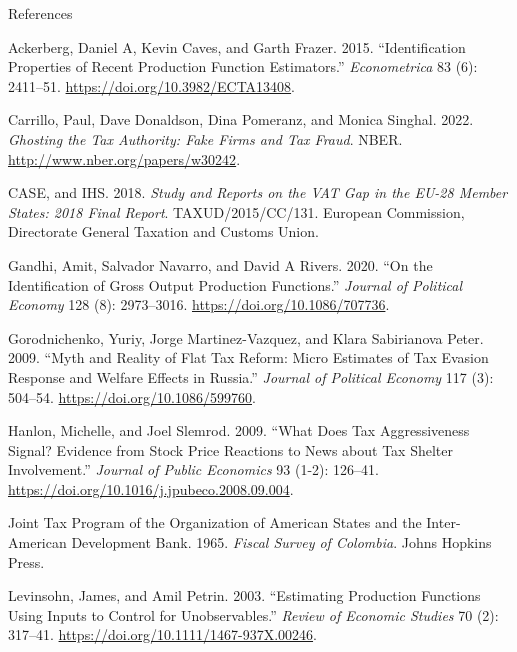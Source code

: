 \documentclass[
  ignorenonframetext,
  aspectratio=169,
]{beamer}
\newlength{\cslhangindent}
\newenvironment{CSLReferences}[2] %
 {\begin{list}{}{%
  \setlength{\itemindent}{0pt}
  \setlength{\leftmargin}{0pt}
  \setlength{\parsep}{0pt}
  \ifodd #1
   \setlength{\leftmargin}{\cslhangindent}
   \setlength{\itemindent}{-1\cslhangindent}
  \fi
  \setlength{\itemsep}{#2\baselineskip}}}
 {\end{list}}
\begin{document}
\begin{frame}{References}
\protect{}\label{references}
\protect{}\label{refs}
\begin{CSLReferences}{1}{1}
Ackerberg, Daniel A, Kevin Caves, and Garth Frazer. 2015.
{``Identification Properties of Recent Production Function
Estimators.''} \emph{Econometrica} 83 (6): 2411--51.
\url{https://doi.org/10.3982/ECTA13408}.

Carrillo, Paul, Dave Donaldson, Dina Pomeranz, and Monica Singhal. 2022.
\emph{Ghosting the Tax Authority: Fake Firms and Tax Fraud}. NBER.
\url{http://www.nber.org/papers/w30242}.

CASE, and IHS. 2018. \emph{Study and Reports on the {VAT} Gap in the
{EU}-28 Member States: 2018 Final Report}. TAXUD/2015/CC/131. {European
Commission, Directorate General Taxation and Customs Union}.

Gandhi, Amit, Salvador Navarro, and David A Rivers. 2020. {``On the
Identification of Gross Output Production Functions.''} \emph{Journal of
Political Economy} 128 (8): 2973--3016.
\url{https://doi.org/10.1086/707736}.

Gorodnichenko, Yuriy, Jorge Martinez-Vazquez, and Klara Sabirianova
Peter. 2009. {``Myth and Reality of Flat Tax Reform: Micro Estimates of
Tax Evasion Response and Welfare Effects in {Russia}.''} \emph{Journal
of Political Economy} 117 (3): 504--54.
\url{https://doi.org/10.1086/599760}.

Hanlon, Michelle, and Joel Slemrod. 2009. {``What Does Tax
Aggressiveness Signal? Evidence from Stock Price Reactions to News about
Tax Shelter Involvement.''} \emph{Journal of Public Economics} 93 (1-2):
126--41. \url{https://doi.org/10.1016/j.jpubeco.2008.09.004}.

Joint Tax Program of the Organization of American States and the
Inter-American Development Bank. 1965. \emph{Fiscal Survey of
{Colombia}}. Johns Hopkins Press.

Levinsohn, James, and Amil Petrin. 2003. {``Estimating Production
Functions Using Inputs to Control for Unobservables.''} \emph{Review of
Economic Studies} 70 (2): 317--41.
\url{https://doi.org/10.1111/1467-937X.00246}.


\end{CSLReferences}
\end{frame}
\end{document}
